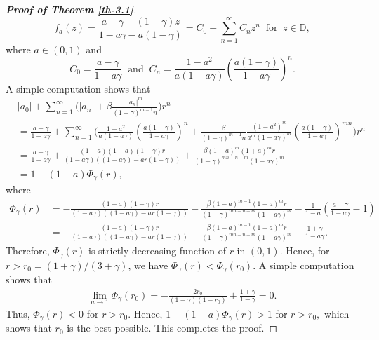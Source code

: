 \documentclass[a4paper,12pt]{amsart}
\theoremstyle{plain}
\theoremstyle{definition}
\begin{document}
\begin{proof}[\bf Proof of Theorem \ref{th-3.1}]
\begin{equation*}
	f_{a}(z)=\frac{a-\gamma-(1-\gamma)z}{1-a\gamma-a(1-\gamma)}=C_0-\sum_{n=1}^{\infty}C_nz^n\;\;\text{for}\;\; z\in\mathbb{D},
\end{equation*} where $ a\in (0,1) $ and 
\begin{equation*}
	C_0=\frac{a-\gamma}{1-a\gamma}\;\; \text{and}\;\; C_n=\frac{1-a^2}{a(1-a\gamma)}\left(\frac{a(1-\gamma)}{1-a\gamma}\right)^n.
\end{equation*}
A simple computation shows that
\begin{align*} &
	|a_0|+\sum_{n=1}^{\infty}\bigg(|a_n|+\beta\frac{|a_n|^m}{(1-\gamma)^{m-1}n}\bigg)r^n\\&= \frac{a-\gamma}{1-a\gamma}+\sum_{n=1}^{\infty}\bigg(\frac{1-a^2}{a(1-a\gamma)}\left(\frac{a(1-\gamma)}{1-a\gamma}\right)^n+\frac{\beta}{(1-\gamma)^{m-1}n}\frac{(1-a^2)^m}{a^m(1-a\gamma)^m}\left(\frac{a(1-\gamma)}{1-a\gamma}\right)^{mn}\bigg)r^n\\&= \frac{a-\gamma}{1-a\gamma}+\frac{(1+a)(1-a)(1-\gamma)r}{(1-a\gamma)\left((1-a\gamma)-ar(1-\gamma)\right)}+\frac{\beta(1-a)^m(1+a)^mr}{(1-\gamma)^{mn-n-m}(1-a\gamma)^m}\\&=1-(1-a)\Phi_{\gamma}(r),
\end{align*}
where 
\begin{align*} 
	\Phi_{\gamma}(r)&=-\frac{(1+a)(1-\gamma)r}{(1-a\gamma)((1-a\gamma)-ar(1-\gamma))}-\frac{\beta(1-a)^{m-1}(1+a)^mr}{(1-\gamma)^{mn-n-m}(1-a\gamma)^m}-\frac{1}{1-a}\left(\frac{a-\gamma}{1-a\gamma}-1\right)\\&=-\frac{(1+a)(1-\gamma)r}{(1-a\gamma)((1-a\gamma)-ar(1-\gamma))}-\frac{\beta(1-a)^{m-1}(1+a)^mr}{(1-\gamma)^{mn-n-m}(1-a\gamma)^m}-\frac{1+\gamma}{1-a\gamma}.
\end{align*}
Therefore, $ \Phi_{\gamma}(r) $ is strictly decreasing function of $ r$ in $(0,1)$. Hence, for $ r>r_0=(1+\gamma)/(3+\gamma) $, we have $ \Phi_{\gamma}(r)<\Phi_{\gamma}(r_0) $. A simple computation shows that 
\begin{align*}
	\lim_{a\rightarrow 1}\Phi_{\gamma}(r_0)=-\frac{2r_0}{(1-\gamma)(1-r_0)}+\frac{1+\gamma}{1-\gamma}=0.
\end{align*}
Thus, $ \Phi_{\gamma}(r)< 0 $ for $ r>r_0 $. Hence, $ 1-(1-a)\Phi_{\gamma}(r)>1 $ for $ r>r_0, $ which shows that $ r_0 $ is the best possible. This completes the proof.
\end{proof}	
\end{document}

